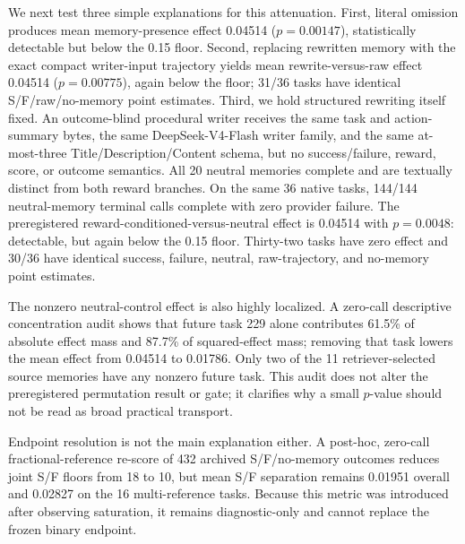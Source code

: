We next test three simple explanations for this attenuation. First, literal omission produces mean memory-presence effect 0.04514 ($p=0.00147$), statistically detectable but below the 0.15 floor. Second, replacing rewritten memory with the exact compact writer-input trajectory yields mean rewrite-versus-raw effect 0.04514 ($p=0.00775$), again below the floor; 31/36 tasks have identical S/F/raw/no-memory point estimates. Third, we hold structured rewriting itself fixed. An outcome-blind procedural writer receives the same task and action-summary bytes, the same DeepSeek-V4-Flash writer family, and the same at-most-three Title/Description/Content schema, but no success/failure, reward, score, or outcome semantics. All 20 neutral memories complete and are textually distinct from both reward branches. On the same 36 native tasks, 144/144 neutral-memory terminal calls complete with zero provider failure. The preregistered reward-conditioned-versus-neutral effect is 0.04514 with $p=0.0048$: detectable, but again below the 0.15 floor. Thirty-two tasks have zero effect and 30/36 have identical success, failure, neutral, raw-trajectory, and no-memory point estimates.

The nonzero neutral-control effect is also highly localized. A zero-call descriptive concentration audit shows that future task 229 alone contributes 61.5\% of absolute effect mass and 87.7\% of squared-effect mass; removing that task lowers the mean effect from 0.04514 to 0.01786. Only two of the 11 retriever-selected source memories have any nonzero future task. This audit does not alter the preregistered permutation result or gate; it clarifies why a small $p$-value should not be read as broad practical transport.

Endpoint resolution is not the main explanation either. A post-hoc, zero-call fractional-reference re-score of 432 archived S/F/no-memory outcomes reduces joint S/F floors from 18 to 10, but mean S/F separation remains 0.01951 overall and 0.02827 on the 16 multi-reference tasks. Because this metric was introduced after observing saturation, it remains diagnostic-only and cannot replace the frozen binary endpoint.

